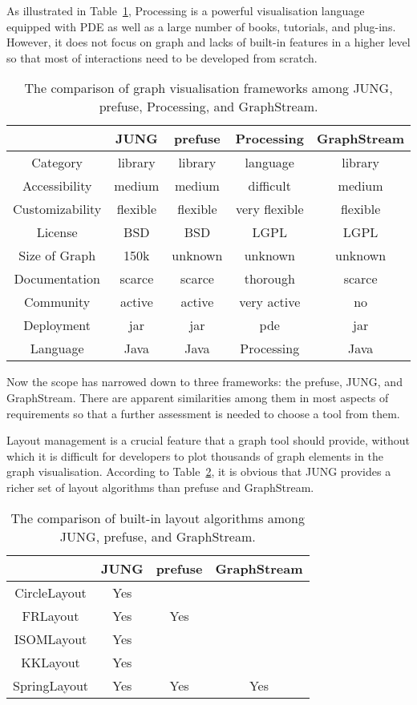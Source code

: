 As illustrated in Table~\ref{tab:03_01}, Processing is a powerful visualisation language equipped with PDE as well as a large number of books, tutorials, and plug-ins. However, it does not focus on graph and lacks of built-in features in a higher level so that most of interactions need to be developed from scratch.

\begin{table}
	\centering
		\begin{tabular}{ | c | c | c | c | c |}
			\hline    
     & JUNG & prefuse & Processing & GraphStream\\ \hline
Category & library & library & language & library\\ \hline
Accessibility & medium & medium & difficult & medium\\ \hline
Customizability & flexible & flexible & very flexible & flexible\\ \hline
License & BSD & BSD & LGPL & LGPL\\ \hline
Size of Graph & 150k & unknown & unknown & unknown\\ \hline
Documentation & scarce & scarce & thorough & scarce\\ \hline
Community & active & active & very active & no\\ \hline
Deployment & jar & jar & pde & jar\\ \hline
Language & Java & Java & Processing & Java\\ \hline

    \hline
		\end{tabular}
	\caption{The comparison of graph visualisation frameworks among JUNG, prefuse, Processing, and GraphStream.}
	\label{tab:03_01}
\end{table}

Now the scope has narrowed down to three frameworks: the prefuse, JUNG, and GraphStream. There are apparent similarities among them in most aspects of requirements so that a further assessment is needed to choose a tool from them.

Layout management is a crucial feature that a graph tool should provide, without which it is difficult for developers to plot thousands of graph elements in the graph visualisation. According to Table~\ref{tab:03_02}, it is obvious that JUNG provides a richer set of layout algorithms than prefuse and GraphStream.

\begin{table}
	\centering
		\begin{tabular}{ | c | c | c | c |}
		\hline    
		 & JUNG & prefuse & GraphStream\\ \hline
CircleLayout & Yes &  & \\ \hline
FRLayout  & Yes & Yes & \\ \hline
ISOMLayout &  Yes &  & \\ \hline
KKLayout & Yes &  & \\ \hline
SpringLayout & Yes & Yes & Yes \\
\hline

		\end{tabular}
	\caption{The comparison of built-in layout algorithms among JUNG, prefuse, and GraphStream.}
	\label{tab:03_02}
\end{table}

